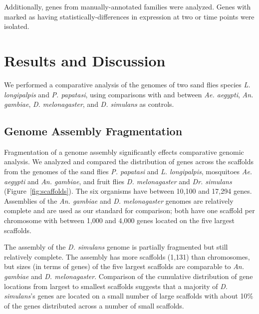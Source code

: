 Additionally, genes from manually-annotated families were analyzed.  Genes with marked as having statistically-differences in expression at two or time points were isolated.

\section{Results and Discussion}
We performed a comparative analysis of the genomes of two sand flies species \emph{L. longipalpis} and \emph{P. papatasi}, using comparisons with and between \emph{Ae. aegypti}, \emph{An. gambiae}, \emph{D. melonagaster}, and \emph{D. simulans} as controls.

\subsection{Genome Assembly Fragmentation}
Fragmentation of a genome assembly significantly effects comparative genomic analysis.  We analyzed and compared the distribution of genes across the scaffolds from the genomes of the sand flies \emph{P. papatasi} and \emph{L. longipalpis}, mosquitoes \emph{Ae. aegypti} and \emph{An. gambiae}, and fruit flies \emph{D. melonagaster} and \emph{Dr. simulans} (Figure~\ref{fig:scaffolds}).  The six organisms have between 10,100 and 17,294 genes.  Assemblies of the \emph{An. gambiae} and \emph{D. melonagaster} genomes are relatively complete and are used as our standard for comparison; both have one scaffold per chromosome with between 1,000 and 4,000 genes located on the five largest scaffolds.

The assembly of the \emph{D. simulans} genome is partially fragmented but still relatively complete.  The assembly has more scaffolds (1,131) than chromosomes, but sizes (in terms of genes) of the five largest scaffolds are comparable to \emph{An. gambiae} and \emph{D. melonagaster}.  Comparison of the cumulative distribution of gene locations from largest to smallest scaffolds suggests that a majority of \emph{D. simulans}'s genes are located on a small number of large scaffolds with about 10\% of the genes distributed across a number of small scaffolds.

